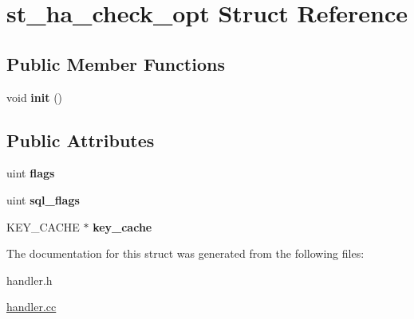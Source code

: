 \hypertarget{structst__ha__check__opt}{}\section{st\+\_\+ha\+\_\+check\+\_\+opt Struct Reference}
\label{structst__ha__check__opt}
\subsection*{Public Member Functions}
\begin{DoxyCompactItemize}
\item 
\mbox{\label{structst__ha__check__opt_ab79cefd5a552f3096390797e6098cee1}} 
void {\bfseries init} ()
\end{DoxyCompactItemize}
\subsection*{Public Attributes}
\begin{DoxyCompactItemize}
\item 
\mbox{\label{structst__ha__check__opt_a1fe13116281011941de1d9c6f9413543}} 
uint {\bfseries flags}
\item 
\mbox{\label{structst__ha__check__opt_ab293b68c31d60bbfb9115845673a0bf5}} 
uint {\bfseries sql\+\_\+flags}
\item 
\mbox{\label{structst__ha__check__opt_adfe4d824a70989125aec423a360ac7df}} 
K\+E\+Y\+\_\+\+C\+A\+C\+HE $\ast$ {\bfseries key\+\_\+cache}
\end{DoxyCompactItemize}


The documentation for this struct was generated from the following files\+:\begin{DoxyCompactItemize}
\item 
handler.\+h\item 
\mbox{\hyperlink{handler_8cc}{handler.\+cc}}\end{DoxyCompactItemize}
